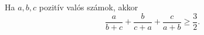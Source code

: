 Ha $a,b,c$ pozitív valós számok, akkor
$$
\frac{a}{b+c}+\frac{b}{c+a}+\frac{c}{a+b} \ge \frac{3}{2}.
$$
